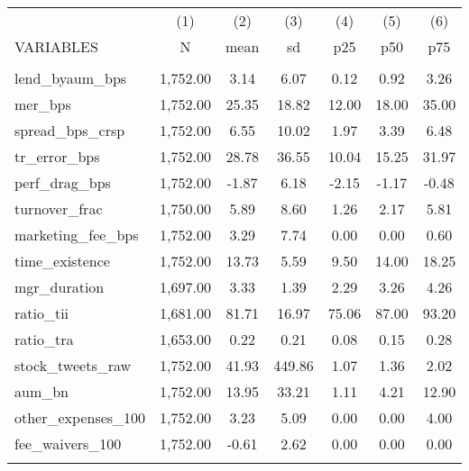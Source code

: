 \documentclass[]{article}
\begin{document}
\begin{tabular}{lcccccc} \hline
 & (1) & (2) & (3) & (4) & (5) & (6) \\
VARIABLES & N & mean & sd & p25 & p50 & p75 \\ \hline
 &  &  &  &  &  &  \\
lend\_byaum\_bps & 1,752.00 & 3.14 & 6.07 & 0.12 & 0.92 & 3.26 \\
mer\_bps & 1,752.00 & 25.35 & 18.82 & 12.00 & 18.00 & 35.00 \\
spread\_bps\_crsp & 1,752.00 & 6.55 & 10.02 & 1.97 & 3.39 & 6.48 \\
tr\_error\_bps & 1,752.00 & 28.78 & 36.55 & 10.04 & 15.25 & 31.97 \\
perf\_drag\_bps & 1,752.00 & -1.87 & 6.18 & -2.15 & -1.17 & -0.48 \\
turnover\_frac & 1,750.00 & 5.89 & 8.60 & 1.26 & 2.17 & 5.81 \\
marketing\_fee\_bps & 1,752.00 & 3.29 & 7.74 & 0.00 & 0.00 & 0.60 \\
time\_existence & 1,752.00 & 13.73 & 5.59 & 9.50 & 14.00 & 18.25 \\
mgr\_duration & 1,697.00 & 3.33 & 1.39 & 2.29 & 3.26 & 4.26 \\
ratio\_tii & 1,681.00 & 81.71 & 16.97 & 75.06 & 87.00 & 93.20 \\
ratio\_tra & 1,653.00 & 0.22 & 0.21 & 0.08 & 0.15 & 0.28 \\
stock\_tweets\_raw & 1,752.00 & 41.93 & 449.86 & 1.07 & 1.36 & 2.02 \\
aum\_bn & 1,752.00 & 13.95 & 33.21 & 1.11 & 4.21 & 12.90 \\
other\_expenses\_100 & 1,752.00 & 3.23 & 5.09 & 0.00 & 0.00 & 4.00 \\
fee\_waivers\_100 & 1,752.00 & -0.61 & 2.62 & 0.00 & 0.00 & 0.00 \\
 &  &  &  &  &  &  \\ \hline
\end{tabular}
\end{document}
